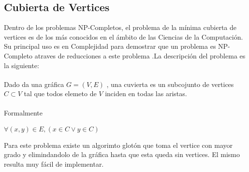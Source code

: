 \documentclass[oneside,12pt]{article}
\begin{document}
\subsection{Cubierta de Vertices}
Dentro de los problemas NP-Completos, el problema de la mínima cubierta de vertices es de los más conocidos en el ámbito de las Ciencias de la Computación. Su principal uso es en Complejidad para demostrar que un problema es NP-Completo atraves de reducciones a este problema \cite{vertexcover}.La descripción del problema es la siguiente:\\\\
Dado da una gráfica $G = (V,E)$ , una cuvierta es un subcojunto de vertices $C \subset V$ tal que todos elemeto de $V$ inciden en todas las aristas.\\\\
Formalmente
\begin{center}
\textbf{$\forall (x,y) \in E, (x \in C \vee y \in C) $}
\end{center}  
Para este problema existe un algorimto glotón que toma el vertice con mayor grado y elimindandolo de la gráfica hasta que esta queda sin vertices. El mismo resulta muy fácil de implementar.\\
\end{document}
